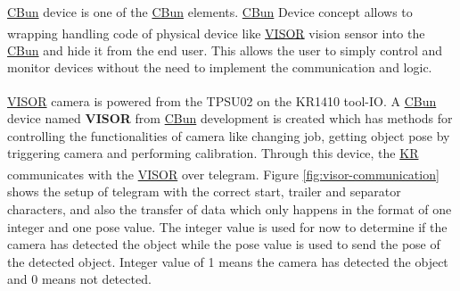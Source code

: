 \hyperref[acro:CBun]{CBun} device is one of the \hyperref[acro:CBun]{CBun} elements. \hyperref[acro:CBun]{CBun} Device concept allows to wrapping handling code of physical device like \hyperref[acro:VISOR]{VISOR}\textsuperscript{\textregistered} vision sensor into the \hyperref[acro:CBun]{CBun} and hide it from the end user. This allows the user to simply control and monitor devices without the need to implement the communication and logic. \cite{cbun-device}

\hyperref[acro:VISOR]{VISOR}\textsuperscript{\textregistered} camera is powered from the TPSU02 on the KR1410 tool-IO.
A \hyperref[acro:CBun]{CBun} device named \textbf{VISOR} from \hyperref[acro:CBun]{CBun} development is created which has methods for
controlling the functionalities of camera like changing job, getting object pose by triggering camera and performing calibration. Through this
device, the \hyperref[acro:KR]{KR} communicates with the \hyperref[acro:VISOR]{VISOR}\textsuperscript{\textregistered} over telegram. Figure \ref{fig:visor-communication} shows the setup of telegram with the correct start, trailer and separator characters, and also the transfer of data which only happens in the format of one integer and one pose value. The integer value is used for now to determine if the camera has detected the object while the pose value is used to send the pose of the detected object. Integer value of 1 means the camera has detected the object and 0 means not detected.


